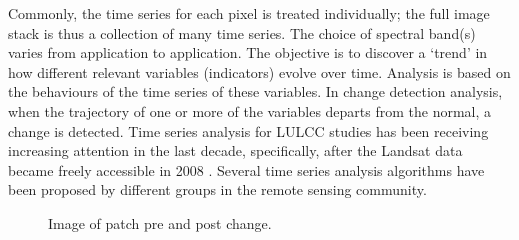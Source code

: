 \documentclass[a4paper,11pt]{article}
\begin{document}
Commonly,
the time series for each pixel is treated individually; the full image
stack is thus a collection of many time series. The choice of spectral band(s)
varies from application to application. The objective is to
discover a `trend' in how different relevant variables (indicators) evolve over
time. Analysis is based on the behaviours of the time series of these
variables. In change detection analysis, when the trajectory of one or more of
the variables departs from the normal, a change is detected. 
Time series analysis for LULCC studies has been receiving increasing attention
in the last decade, specifically, after the Landsat data became freely
accessible in 2008 \cite{WoodcockLandsatFreeaccess}. Several time series analysis 
algorithms have been proposed by different groups in the remote sensing 
community.

\begin{figure}
    \centering
    \qquad
    \caption{Image of patch pre and post change.}%
    \label{fig:example}%
\end{figure}
\end{document}
